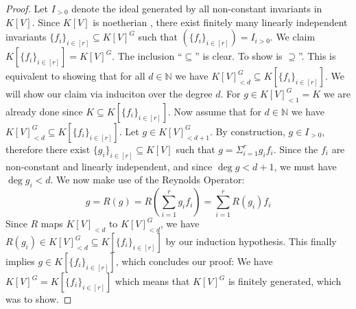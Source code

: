 \begin{proof}
  Let $I_{>0}$ denote the ideal generated by all non-constant invariants in $K[V]$.
  Since $K[V]$ is noetherian \cite[p.~131]{Bos13}, there exist finitely many linearly independent invariants $\{f_i\}_{i \in [r]} \subseteq K[V]^G$ such that $ \left( \{f_i\}_{i \in [r]} \right) = I_{i>0} $.
  We claim $K[\{f_i\}_{i \in [r]}] = K[V]^G$.
  The inclusion ``$\subseteq$'' is clear.
  To show is $\supseteq$''.
  This is equivalent to showing that for all $d \in \mathbb{N}$ we have $K[V]^G_{<d} \subseteq K[\{f_i\}_{i \in [r]}] $.
  We will show our claim via induciton over the degree $d$.
  For $g \in K[V]^G_{<1} = K$ we are already done since $K \subseteq K[\{f_i\}_{i \in [r]}]$.
  Now assume that for $d \in \mathbb{N}$ we have $K[V]^G_{<d} \subseteq K[\{f_i\}_{i \in [r]}]$.
  Let $g \in K[V]^G_{< d+1}$.
  By construction, $g \in I_{>0}$, therefore there exist $\{g_i\}_{i \in [r]} \subseteq K[V]$ such that $g = \Sigma_{i=1}^r g_i f_i$.
  Since the $f_i$ are non-constant and linearly independent, and since $\operatorname{deg} g < d+1$, we must have $ \operatorname{deg} g_i < d $.
  We now make use of the Reynolds Operator:
  \begin{equation}
      g = R(g)
      =  R \left( \sum_{i=1}^r g_i f_i \right)
      = \sum_{i=1}^r R( g_i) f_i
  \end{equation}
  Since $R$ maps $K[V]_{<d}$ to $K[V]^G_{<d}$, we have $R(g_i) \in K[V]^G_{<d} \subseteq K[\{f_i\}_{i \in [r]}]$ by our induction hypothesis.
  This finally implies $ g \in K[\{f_i\}_{i \in [r]}]$, which concludes our proof:
  We have $K[V]^G = K[\{f_i\}_{i \in [r]}]$ which means that $K[V]^G$ is finitely generated, which was to show.
\end{proof}

